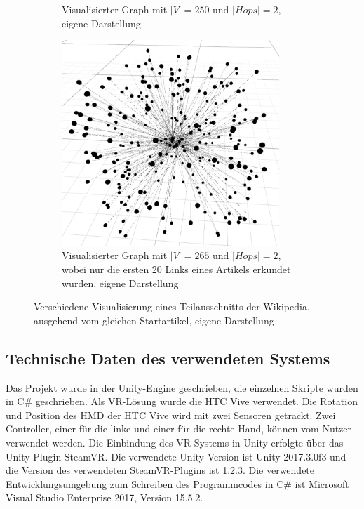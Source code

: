 \documentclass[12pt, a4paper]{article}
\begin{document}
\begin{figure}
\begin{subfigure}[t]{0.45\textwidth}
\caption[Visualisierter Graph mit $|V|=250$ und $|Hops|=2$]{Visualisierter Graph mit $|V|=250$ und $|Hops|=2$, eigene Darstellung}
\label{graph_2hop_250}
\vspace{0.5cm}
\end{subfigure}
\begin{subfigure}[t]{0.85\textwidth}
\centering
\includegraphics[width=0.9\textwidth]{Roger_Waters_2Hop_265Nodes_FR1157_WEB5906_neighborlimit20.png}
\caption[]{Visualisierter Graph mit $|V|=265$ und $|Hops|=2$, wobei nur die ersten 20 Links eines Artikels erkundet wurden, eigene Darstellung}
\label{graph_2hop_neighborlimit}
\end{subfigure}
\caption{Verschiedene Visualisierung eines Teilausschnitts der Wikipedia, ausgehend vom gleichen Startartikel, eigene Darstellung}
\end{figure}

\newpage
\subsection{Technische Daten des verwendeten Systems}
Das Projekt wurde in der Unity-Engine geschrieben, die einzelnen Skripte wurden in C\# geschrieben. Als VR-Lösung wurde die HTC Vive verwendet. Die Rotation und Position des HMD der HTC Vive wird mit zwei Sensoren getrackt. Zwei Controller, einer für die linke und einer für die rechte Hand, können vom Nutzer verwendet werden. Die Einbindung des VR-Systems in Unity erfolgte über das Unity-Plugin SteamVR. Die verwendete Unity-Version ist Unity 2017.3.0f3 und die Version des verwendeten SteamVR-Plugins ist 1.2.3. Die verwendete Entwicklungsumgebung zum Schreiben des Programmcodes in C\# ist Microsoft Visual Studio Enterprise 2017, Version 15.5.2.\\
\end{document}
